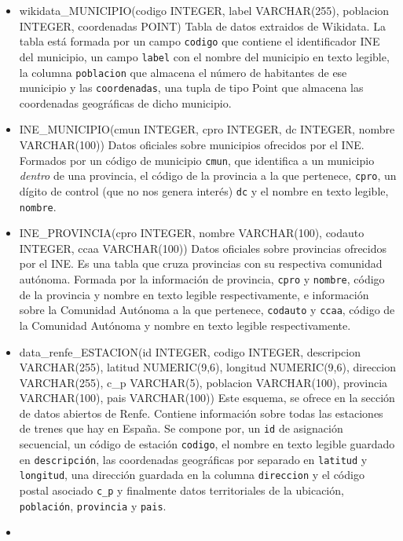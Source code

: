 \begin{itemize}
\tightlist
\item
  wikidata\_MUNICIPIO(codigo INTEGER, label VARCHAR(255), poblacion
  INTEGER, coordenadas POINT) Tabla de datos extraidos de Wikidata. La
  tabla está formada por un campo \texttt{codigo} que contiene el
  identificador INE del municipio, un campo \texttt{label} con el nombre
  del municipio en texto legible, la columna \texttt{poblacion} que
  almacena el número de habitantes de ese municipio y las
  \texttt{coordenadas}, una tupla de tipo Point que almacena las
  coordenadas geográficas de dicho municipio.
\item
  INE\_MUNICIPIO(cmun INTEGER, cpro INTEGER, dc INTEGER, nombre
  VARCHAR(100)) Datos oficiales sobre municipios ofrecidos por el INE.
  Formados por un código de municipio \texttt{cmun}, que identifica a un
  municipio \emph{dentro} de una provincia, el código de la provincia a
  la que pertenece, \texttt{cpro}, un dígito de control (que no nos
  genera interés) \texttt{dc} y el nombre en texto legible,
  \texttt{nombre}.
\item
  INE\_PROVINCIA(cpro INTEGER, nombre VARCHAR(100), codauto INTEGER,
  ccaa VARCHAR(100)) Datos oficiales sobre provincias ofrecidos por el
  INE. Es una tabla que cruza provincias con su respectiva comunidad
  autónoma. Formada por la información de provincia, \texttt{cpro} y
  \texttt{nombre}, código de la provincia y nombre en texto legible
  respectivamente, e información sobre la Comunidad Autónoma a la que
  pertenece, \texttt{codauto} y \texttt{ccaa}, código de la Comunidad
  Autónoma y nombre en texto legible respectivamente.
\item
  data\_renfe\_ESTACION(id INTEGER, codigo INTEGER, descripcion
  VARCHAR(255), latitud NUMERIC(9,6), longitud NUMERIC(9,6), direccion
  VARCHAR(255), c\_p VARCHAR(5), poblacion VARCHAR(100), provincia
  VARCHAR(100), pais VARCHAR(100)) Este esquema, se ofrece en la sección
  de datos abiertos de Renfe. Contiene información sobre todas las
  estaciones de trenes que hay en España. Se compone por, un \texttt{id}
  de asignación secuencial, un código de estación \texttt{codigo}, el
  nombre en texto legible guardado en \texttt{descripción}, las
  coordenadas geográficas por separado en \texttt{latitud} y
  \texttt{longitud}, una dirección guardada en la columna
  \texttt{direccion} y el código postal asociado \texttt{c\_p} y
  finalmente datos territoriales de la ubicación, \texttt{población},
  \texttt{provincia} y \texttt{pais}.
\item

\end{itemize}
